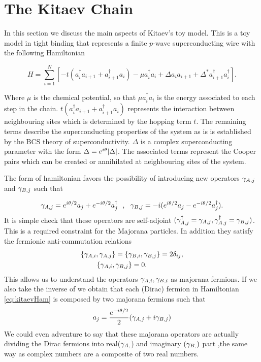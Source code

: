 \section{The Kitaev Chain \label{sec:KitaevChain}}
In this section we discuss the main aspects of Kitaev's toy model. This is a toy model in tight binding that represents a  finite $p$-wave superconducting wire with the following Hamiltonian

\begin{equation}
H = \sum_{i=1}^N \left[ -t(a_i^{\dagger} a_{i+1} + a_{i+1}^{\dagger}a_i) -\mu a_i^{\dagger} a_{i} +  \Delta a_{i}a_{i+1} + \Delta^* a_{i+1}^{\dagger}a_i^{\dagger} \right].  \label{eq:kitaevHam}
\end{equation}

Where $\mu$ is the chemical potential, so that $\mu a_i^{\dagger} a_{i}$ is the energy associated to each step in the chain. $t(a_i^{\dagger} a_{i+1} + a_{i+1}^{\dagger}a_i)$ represents the interaction between neighbouring sites which is determined by the hopping term $t$. The remaining terms describe the superconducting properties of the system as is is established by the BCS theory of superconductivity. $\Delta$ is a complex superconducting parameter with the form  $\Delta = e^{i\theta} \vert \Delta \vert$. The associated terms represent the Cooper pairs which can be created or annihilated at neighbouring sites of the system.

The form of hamiltonian  favors the possibility of introducing new operators $\gamma_{A,j}$ and $\gamma_{B,j}$ such that

\begin{equation}
\gamma_{A,j} = e^{i\theta /2}a_j+ e^{-i\theta/2 } a^{\dagger}_j \ \ , \ \ \gamma_{B,j} = -i(e^{i\theta /2}a_j - e^{-i\theta/2} a^{\dagger}_j).
\label{eq:majoranaTrans}
\end{equation}
It is simple check that these operators are self-adjoint $(\gamma_{A,j}^\dagger = \gamma_{A,j}, \gamma_{A,j}^\dagger = \gamma_{B,j})$. This is a required constraint for the Majorana particles. In addition they satisfy the fermionic anti-commutation relations
\begin{equation}
\begin{aligned}
\{\gamma_{A,i}, \gamma_{A,j}\} = \{ & \gamma_{B,i} , \gamma_{B,j}\} = 2\delta_{ij}  ,\\ 
  \{\gamma_{A,i}, \gamma_{B,j} & \} =0.
\end{aligned} 
\label{majoranaRel}
\end{equation} 
This allows us to understand the operators $\gamma_{A,i} , \gamma_{B,i}$ as majorana fermions. If we also take the inverse of  we obtain that each  (Dirac) fermion in Hamiltonian \eqref{eq:kitaevHam} is composed by two majorana fermions such that 
$$a_j = \frac{e^{-i\theta/2}}{2}(\gamma_{A,j}+ i\gamma_{B,j})$$
We could even adventure to say that these majorana operators are actually dividing the Dirac fermions into real($\gamma_{A,}$) and imaginary $(\gamma_{B,})$ part ,the same way as complex numbers are a composite of two real numbers. 

